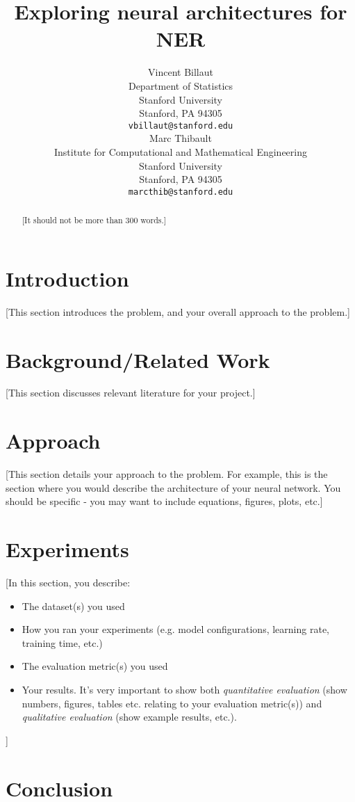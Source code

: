 \documentclass{article} %
\title{Exploring neural architectures for NER}
\author{
Vincent Billaut\\
Department of Statistics\\
Stanford University\\
Stanford, PA 94305 \\
\texttt{vbillaut@stanford.edu} \\
\And
Marc Thibault \\
Institute for Computational and Mathematical Engineering \\
Stanford University\\
Stanford, PA 94305 \\
\texttt{marcthib@stanford.edu} \\
}
\begin{document}
\maketitle

\begin{abstract}
[It should not be more than 300 words.]
\end{abstract}

\section{Introduction}

[This section introduces the problem, and your overall approach to the problem.]

\section{Background/Related Work}

[This section discusses relevant literature for your project.]

\section{Approach}

[This section details your approach to the problem. For example, this is the section where you would describe the architecture of your neural network. You should be specific - you may want to include equations, figures, plots, etc.]

\section{Experiments}

[In this section, you describe: 
\begin{itemize}
\item The dataset(s) you used
\item How you ran your experiments (e.g. model configurations, learning rate, training time, etc.) 
\item The evaluation metric(s) you used 
\item Your results. It's very important to show both \textit{quantitative evaluation} (show numbers, figures, tables etc. relating to your evaluation metric(s)) and \textit{qualitative evaluation} (show example results, etc.). 
\end{itemize}]

\section{Conclusion}
\end{document}
